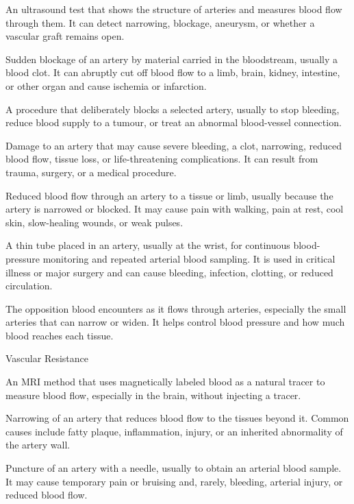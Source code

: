  An ultrasound test that shows the structure of arteries and measures blood flow through them. It can detect narrowing, blockage, aneurysm, or whether a vascular graft remains open.

 Sudden blockage of an artery by material carried in the bloodstream, usually a blood clot. It can abruptly cut off blood flow to a limb, brain, kidney, intestine, or other organ and cause ischemia or infarction.

 A procedure that deliberately blocks a selected artery, usually to stop bleeding, reduce blood supply to a tumour, or treat an abnormal blood-vessel connection.

 Damage to an artery that may cause severe bleeding, a clot, narrowing, reduced blood flow, tissue loss, or life-threatening complications. It can result from trauma, surgery, or a medical procedure.

 Reduced blood flow through an artery to a tissue or limb, usually because the artery is narrowed or blocked. It may cause pain with walking, pain at rest, cool skin, slow-healing wounds, or weak pulses.

 A thin tube placed in an artery, usually at the wrist, for continuous blood-pressure monitoring and repeated arterial blood sampling. It is used in critical illness or major surgery and can cause bleeding, infection, clotting, or reduced circulation.

 The opposition blood encounters as it flows through arteries, especially the small arteries that can narrow or widen. It helps control blood pressure and how much blood reaches each tissue.

\synonyms
Vascular Resistance

 An MRI method that uses magnetically labeled blood as a natural tracer to measure blood flow, especially in the brain, without injecting a tracer.

 Narrowing of an artery that reduces blood flow to the tissues beyond it. Common causes include fatty plaque, inflammation, injury, or an inherited abnormality of the artery wall.

 Puncture of an artery with a needle, usually to obtain an arterial blood sample. It may cause temporary pain or bruising and, rarely, bleeding, arterial injury, or reduced blood flow.

